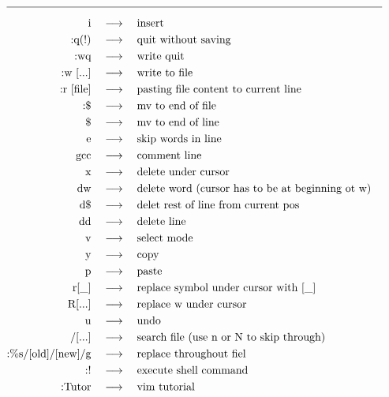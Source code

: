 \begin{align*}
\hline \\[-0.6em]
\text{i}\quad&\longrightarrow\quad\text{insert}\\
\text{:q(!)}\quad&\longrightarrow\quad\text{quit without saving}\\
\text{:wq}\quad&\longrightarrow\quad\text{write quit}\\
\text{:w [...]}\quad&\longrightarrow\quad\text{write to file}\\
\text{:r [file]}\quad&\longrightarrow\quad\text{pasting file content to current line}\\
\text{:\$}\quad&\longrightarrow\quad\text{mv to end of file}\\
\text{\$}\quad&\longrightarrow\quad\text{mv to end of line}\\
\text{e}\quad&\longrightarrow\quad\text{skip words in line}\\
\text{gcc}\quad&\longrightarrow\quad\text{comment line}\\
\text{x}\quad&\longrightarrow\quad\text{delete under cursor}\\
\text{dw}\quad&\longrightarrow\quad\text{delete word (cursor has to be at beginning ot w)}\\
\text{d\$}\quad&\longrightarrow\quad\text{delet rest of line from current pos}\\
\text{dd}\quad&\longrightarrow\quad\text{delete line}\\
\text{v}\quad&\longrightarrow\quad\text{select mode}\\
\text{y}\quad&\longrightarrow\quad\text{copy}\\
\text{p}\quad&\longrightarrow\quad\text{paste}\\
\text{r[\_]}\quad&\longrightarrow\quad\text{replace symbol under cursor with [\_]}\\
\text{R[...]}\quad&\longrightarrow\quad\text{replace w under cursor}\\
\text{u}\quad&\longrightarrow\quad\text{undo}\\
\text{/[...]}\quad&\longrightarrow\quad\text{search file (use n or N to skip through)}\\
\text{:\%s/[old]/[new]/g}\quad&\longrightarrow\quad\text{replace throughout fiel}\\
\text{:!}\quad&\longrightarrow\quad\text{execute shell command} \\
\text{:Tutor}\quad&\longrightarrow\quad\text{vim tutorial}
\end{align*}

\newpage

